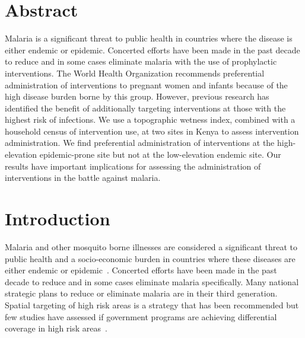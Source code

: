 \documentclass{article}\usepackage[]{graphicx}\usepackage[]{color}
\makeatletter
\newenvironment{kframe}{%
 \def\at@end@of@kframe{}%
 \ifinner\ifhmode%
  \def\at@end@of@kframe{\end{minipage}}%
  \begin{minipage}{\columnwidth}%
 \fi\fi%
 \def\FrameCommand##1{\hskip\@totalleftmargin \hskip-\fboxsep
 \colorbox{shadecolor}{##1}\hskip-\fboxsep
     \hskip-\linewidth \hskip-\@totalleftmargin \hskip\columnwidth}%
 \MakeFramed {\advance\hsize-\width
   \@totalleftmargin\z@ \linewidth\hsize
   \@setminipage}}%
 {\par\unskip\endMakeFramed%
 \at@end@of@kframe}
\newenvironment{knitrout}{}{} %
\makeatother
\begin{document}
\begin{knitrout}
\color{fgcolor}\begin{kframe}


{\ttfamily\noindent\bfseries\color{errorcolor}{\#\# Error in library(ggmap): there is no package called 'ggmap'}}\end{kframe}
\end{knitrout}





\section{Abstract}
Malaria is a significant threat to public health in countries where the disease is either endemic or epidemic. Concerted efforts have been made in the past decade to reduce and in some cases eliminate malaria with the use of prophylactic interventions. The World Health Organization recommends preferential administration of interventions to pregnant women and infants because of the high disease burden borne by this group. However,  previous research has identified the benefit of additionally targeting interventions at those with the highest risk of infections. We use a topographic wetness index,  combined with a household census of intervention use,  at two sites in Kenya to assess intervention administration. We find preferential administration of interventions at the high-elevation epidemic-prone site but not at the low-elevation endemic site. Our results have important implications for assessing the administration of interventions in the battle against malaria.


\section{Introduction}

Malaria and other mosquito borne illnesses are considered a significant threat to public health and a socio-economic burden in countries where these diseases are either endemic or epidemic~\cite{Crouch2005}. Concerted efforts have been made in the past decade to reduce and in some cases eliminate malaria specifically. Many national strategic plans to reduce or eliminate malaria are in their third generation.  Spatial targeting of high risk areas is a strategy that has been recommended but few studies have assessed if government programs are achieving differential coverage in high risk areas~\cite{Shantz-Dunn2009}.  \\
\end{document}
